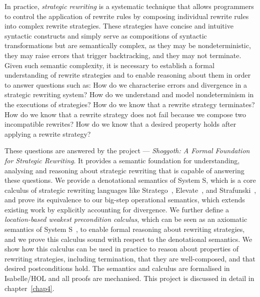 In practice, \emph{strategic rewriting} is a systematic technique that allows programmers to control the application of rewrite rules by composing individual rewrite rules into complex rewrite strategies. These strategies have concise and intuitive syntactic constructs and simply serve as compositions of syntactic transformations but are semantically complex, as they may be nondeterministic, they may raise errors that trigger backtracking, and they may not terminate.
Given such semantic complexity, it is necessary to establish a formal understanding of rewrite strategies and to enable reasoning about them in order to answer questions such as:
How do we characterise errors and divergence in a strategic rewriting system?
How do we understand and model nondeterminism in the executions of strategies?
How do we know that a rewrite strategy terminates?
How do we know that a rewrite strategy does not fail because we compose two incompatible rewrites?
How do we know that a desired property holds after applying a rewrite strategy?

These questions are answered by the project --- \emph{Shoggoth: A Formal Foundation for Strategic Rewriting}. It provides a semantic foundation for understanding, analysing and reasoning about strategic rewriting that is capable of answering these questions.
We provide a denotational semantics of System S, which is a core calculus of strategic rewriting languages like Stratego~\citep{DBLP:conf/icfp/VisserBT98,10.1007/3-540-45127-7_27}, Elevate~\citep{DBLP:journals/cacm/HagedornLKQGS23,DBLP:journals/pacmpl/HagedornLKQGS20}, and Strafunski~\citep{DBLP:conf/rule/LammelV02}, and prove its equivalence to our big-step operational semantics, which extends existing work by explicitly accounting for divergence.
We further define a \emph{location-based weakest precondition calculus}, which can be seen as an axiomatic semantics of System S~\cite{VISSER1998422}, to enable formal reasoning about rewriting strategies, and we prove this calculus sound with respect to the denotational semantics.
We show how this calculus can be used in practice to reason about properties of rewriting strategies, including termination, that they are well-composed, and that desired postconditions hold.
The semantics and calculus are formalised in Isabelle/HOL and all proofs are mechanised. This project is discussed in detail in chapter~\ref{chap4}.

